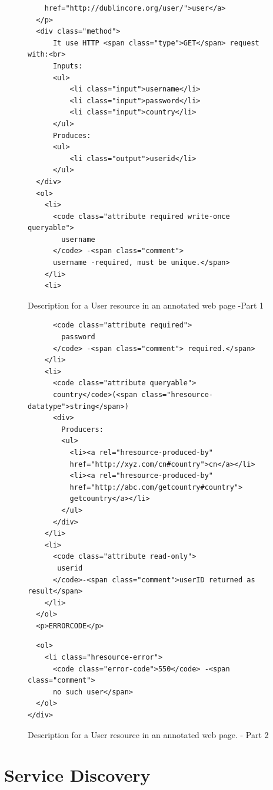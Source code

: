 \begin{spacing}{1.5}
\begin{figure}
\begin{verbatim}
    href="http://dublincore.org/user/">user</a>
  </p>
  <div class="method">
      It use HTTP <span class="type">GET</span> request with:<br>
      Inputs:
      <ul>
          <li class="input">username</li>
          <li class="input">password</li>
          <li class="input">country</li>
      </ul>
      Produces:
      <ul>
          <li class="output">userid</li>
      </ul>
  </div>
  <ol>
    <li>
      <code class="attribute required write-once queryable">
        username
      </code> -<span class="comment">
      username -required, must be unique.</span>
    </li>
    <li>
    \end{verbatim}
\caption{Description for a User resource in an annotated web page -Part 1}
\label{fig:code}
\end{figure}
\begin{figure}
    \begin{verbatim}
      <code class="attribute required">
        password
      </code> -<span class="comment"> required.</span>
    </li>
    <li>
      <code class="attribute queryable">
      country</code>(<span class="hresource-datatype">string</span>)
      <div>
        Producers:
        <ul>
          <li><a rel="hresource-produced-by"
          href="http://xyz.com/cn#country">cn</a></li>
          <li><a rel="hresource-produced-by"
          href="http://abc.com/getcountry#country">
          getcountry</a></li>
        </ul>
      </div>
    </li>
    <li>
      <code class="attribute read-only">
       userid
      </code>-<span class="comment">userID returned as result</span>
    </li>
  </ol>
  <p>ERRORCODE</p>
\end{verbatim}

\begin{verbatim}
  <ol>
    <li class="hresource-error">
      <code class="error-code">550</code> -<span class="comment">
      no such user</span>
  </ol>
</div>
\end{verbatim}
\caption{Description for a User resource in an annotated web page. - Part 2}
\label{fig:code2}
\end{figure}

\section{Service Discovery}
\label{sec:service_disc}


\end{spacing}
